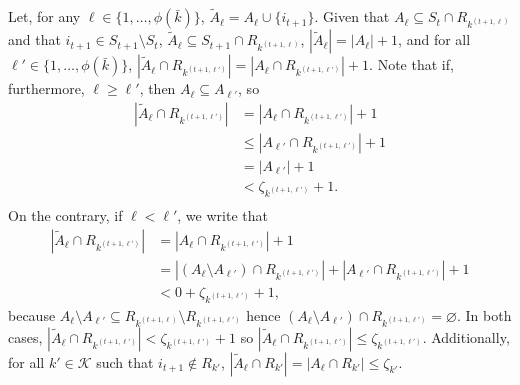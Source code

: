 \documentclass[
  11pt,
  a4paper,
]{article}
\theoremstyle{plain}
\theoremstyle{plain}
\theoremstyle{definition}
\theoremstyle{plain}
\theoremstyle{definition}
\theoremstyle{remark}
\begin{document}
Let, for any \(\ell\in\{1,\dotsc, \phi(\bar k)\}\),
\(\widetilde A_\ell=A_\ell \cup \{ i_{t+1}\}\). Given that
\(A_\ell\subseteq S_t\cap R_{k^{(t+1,\ell)}}\) and that
\(i_{t+1}\in S_{t+1}\setminus S_t\),
\(\widetilde A_\ell\subseteq S_{t+1}\cap R_{k^{(t+1,\ell)}}\),
\(|\widetilde A_\ell|=| A_\ell|+1\), and for all
\(\ell'\in\{1,\dotsc, \phi(\bar k)\}\),
\(|\widetilde A_\ell \cap R_{k^{(t+1,\ell')}} |=| A_\ell\cap R_{k^{(t+1,\ell')}}|+1\).
Note that if, furthermore, \(\ell\geq \ell'\), then
\(A_\ell\subseteq A_{\ell'}\), so \begin{align*}
|\widetilde A_\ell \cap R_{k^{(t+1,\ell')}} |&=| A_\ell\cap R_{k^{(t+1,\ell')}}|+1\\
&\leq | A_{\ell'}\cap R_{k^{(t+1,\ell')}}|+1\\
&= | A_{\ell'}|+1\\
&<\zeta_{k^{(t+1,\ell')}}+1.\\
\end{align*} On the contrary, if \(\ell< \ell'\), we write that
\begin{align*}
|\widetilde A_\ell \cap R_{k^{(t+1,\ell')}} |&=| A_\ell\cap R_{k^{(t+1,\ell')}}|+1\\
&= | (A_{\ell}\setminus A_{\ell'}) \cap R_{k^{(t+1,\ell')}}   | + | A_{\ell'}\cap R_{k^{(t+1,\ell')}}|+1\\
&<  0 +  \zeta_{k^{(t+1,\ell')}} +1,
\end{align*} because
\(A_{\ell}\setminus A_{\ell'} \subseteq   R_{k^{(t+1,\ell)}}\setminus  R_{k^{(t+1,\ell')}}\)
hence
\((A_{\ell}\setminus A_{\ell'}) \cap R_{k^{(t+1,\ell')}}  =\varnothing\).
In both cases,
\(|\widetilde A_\ell \cap R_{k^{(t+1,\ell')}} |< \zeta_{k^{(t+1,\ell')}} +1\)
so
\(|\widetilde A_\ell \cap R_{k^{(t+1,\ell')}} |\leq \zeta_{k^{(t+1,\ell')}}\).
Additionally, for all \(k'\in\mathcal{K}\) such that
\(i_{t+1}\not\in R_{k'}\),
\(|\widetilde A_\ell \cap R_{k'} |=| A_\ell \cap R_{k'} |\leq \zeta_{k'}\).
\end{document}
